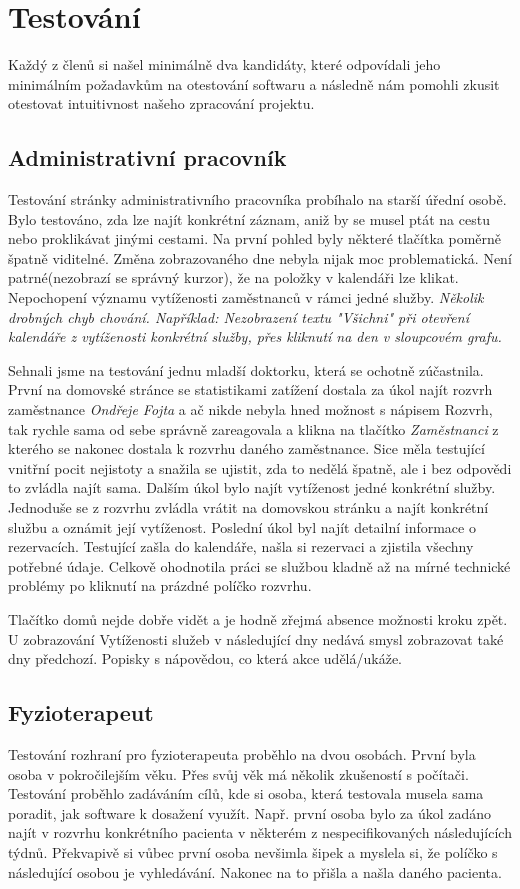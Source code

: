 \section{Testování}
Každý z členů si našel minimálně dva kandidáty, které odpovídali jeho minimálním požadavkům na otestování softwaru a následně nám pomohli zkusit otestovat intuitivnost našeho zpracování projektu.

\subsection{Administrativní pracovník}

Testování stránky administrativního pracovníka probíhalo na starší úřední osobě.
Bylo testováno, zda lze najít konkrétní záznam, aniž by se musel ptát na cestu nebo proklikávat jinými cestami.
Na první pohled byly některé tlačítka poměrně špatně viditelné.
Změna zobrazovaného dne nebyla nijak moc problematická.
Není patrné(nezobrazí se správný kurzor), že na položky v kalendáři lze klikat.
Nepochopení významu vytíženosti zaměstnanců v rámci jedné služby.
\emph{Několik drobných chyb chování. Například: Nezobrazení textu "Všichni" při otevření kalendáře z vytíženosti konkrétní služby, přes kliknutí na den v sloupcovém grafu.}

Sehnali jsme na testování jednu mladší doktorku, která se ochotně zúčastnila. První na domovské stránce se statistikami zatížení dostala za úkol najít rozvrh zaměstnance \emph{Ondřeje Fojta} a ač nikde nebyla hned možnost s nápisem Rozvrh, tak rychle sama od sebe správně zareagovala a klikna na tlačítko \emph{Zaměstnanci} z kterého se nakonec dostala k rozvrhu daného zaměstnance. Sice měla testující vnitřní pocit nejistoty a snažila se ujistit, zda to nedělá špatně, ale i bez odpovědi to zvládla najít sama. 
Dalším úkol bylo najít vytíženost jedné konkrétní služby. Jednoduše se z rozvrhu zvládla vrátit na domovskou stránku a najít konkrétní službu a oznámit její vytíženost. 
Poslední úkol byl najít detailní informace o rezervacích. Testující zašla do kalendáře, našla si rezervaci a zjistila všechny potřebné údaje. Celkově ohodnotila práci se službou kladně až na mírné technické problémy po kliknutí na prázdné políčko rozvrhu. 

Tlačítko domů nejde dobře vidět a je hodně zřejmá absence možnosti kroku zpět.
U zobrazování Vytíženosti služeb v následující dny nedává smysl zobrazovat také dny předchozí.
Popisky s nápovědou, co která akce udělá/ukáže.

\subsection{Fyzioterapeut}
Testování rozhraní pro fyzioterapeuta proběhlo na dvou osobách. První byla osoba v pokročilejším věku. Přes svůj věk má několik zkušeností s počítači. Testování proběhlo zadáváním cílů, kde si osoba, která testovala musela sama poradit, jak software k dosažení využít. Např. první osoba bylo za úkol zadáno najít v rozvrhu konkrétního pacienta v některém z nespecifikovaných následujících týdnů. Překvapivě si vůbec první osoba nevšimla šipek a myslela si, že políčko s následující osobou je vyhledávání. Nakonec na to přišla a našla daného pacienta.

